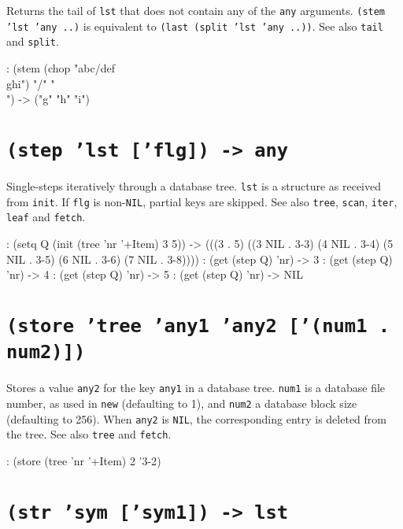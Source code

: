 Returns the tail of \texttt{lst} that does not contain any of the \texttt{any}
arguments. \texttt{(stem 'lst 'any ..)} is equivalent to
\texttt{(last (split 'lst 'any ..))}. See also \texttt{tail} and \texttt{split}.


\begin{wideverbatim}
: (stem (chop "abc/def\\ghi") "/" "\\")
-> ("g" "h" "i")
\end{wideverbatim}

 
\section*{\texttt{(step 'lst ['flg]) -> any}}
\label{sec:func-ref-S-(step 'lst ['flg]) -> any}


Single-steps iteratively through a database tree. \texttt{lst} is a structure
as received from \texttt{init}. If \texttt{flg} is non-\texttt{NIL}, partial keys are
skipped. See also \texttt{tree}, \texttt{scan}, \texttt{iter}, \texttt{leaf} and \texttt{fetch}.


\begin{wideverbatim}
: (setq Q (init (tree 'nr '+Item) 3 5))
-> (((3 . 5) ((3 NIL . {3-3}) (4 NIL . {3-4}) (5 NIL . {3-5}) (6 NIL . {3-6}) (7 NIL . {3-8}))))
: (get (step Q) 'nr)
-> 3
: (get (step Q) 'nr)
-> 4
: (get (step Q) 'nr)
-> 5
: (get (step Q) 'nr)
-> NIL
\end{wideverbatim}

 
\section*{\texttt{(store 'tree 'any1 'any2 ['(num1 . num2)])}}
\label{sec:func-ref-S-(store 'tree 'any1 'any2 ['(num1 . num2)])}


Stores a value \texttt{any2} for the key \texttt{any1} in a database tree. \texttt{num1} is a
database file number, as used in \texttt{new} (defaulting to 1), and \texttt{num2} a
database block size (defaulting to 256). When \texttt{any2} is \texttt{NIL}, the
corresponding entry is deleted from the tree. See also \texttt{tree} and
\texttt{fetch}.


\begin{wideverbatim}
: (store (tree 'nr '+Item) 2 '{3-2})
\end{wideverbatim}

 
\section*{\texttt{(str 'sym ['sym1]) -> lst}}
\label{sec:func-ref-S-(str 'sym ['sym1]) -> lst}


